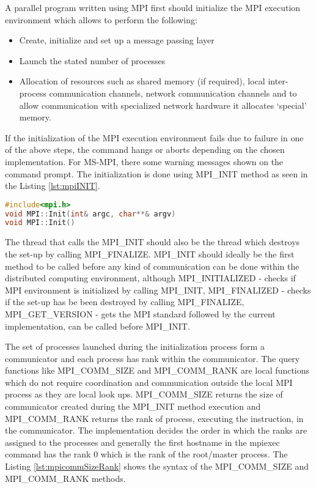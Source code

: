 A parallel program written using MPI first should initialize the MPI execution environment which allows to perform the following:
\begin{itemize}
\item Create, initialize and set up a message passing layer
\item Launch the stated number of processes
\item Allocation of resources such as shared memory (if required), local inter-process communication channels,
network communication channels and to allow communication with specialized network hardware it allocates {\lq}special{\rq} memory.  
\end{itemize}

If the initialization of the MPI execution environment fails due to failure in one of the above steps, the command hangs or aborts depending on the chosen implementation. For MS-MPI, there some warning messages shown on the command prompt. The initialization is done using MPI\_INIT method as seen in the Listing \ref{lst:mpiINIT}. 

\begin{lstlisting}[language=C++,label={lst:mpiINIT},caption={Initialization of Execution Environment}]
#include<mpi.h>
void MPI::Init(int& argc, char**& argv)
void MPI::Init()
\end{lstlisting}

The thread that calls the MPI\_INIT should also be the thread which destroys the set-up by calling MPI\_FINALIZE. MPI\_INIT should ideally be the first method to be called before any kind of communication can be done within the distributed computing environment, although MPI\_INITIALIZED - checks if MPI environment is initialized by calling MPI\_INIT, MPI\_FINALIZED - checks if the set-up has be been destroyed by calling MPI\_FINALIZE, MPI\_GET\_VERSION - gets the MPI standard followed by the current implementation, can be called before MPI\_INIT. \newline

The set of processes launched during the initialization process form a communicator and each process has rank within the communicator.
The query functions like MPI\_COMM\_SIZE and MPI\_COMM\_RANK are local functions which do not require coordination and communication outside the local MPI process as they are local look ups. MPI\_COMM\_SIZE returns the size of communicator created during the  MPI\_INIT method execution and MPI\_COMM\_RANK returns the rank of process, executing the instruction, in the communicator. The implementation decides the order in which the ranks are assigned to the processes and generally the first hostname in the mpiexec command has the rank 0 which is the rank of the root/master process. The Listing \ref{lst:mpicommSizeRank} shows the syntax of the MPI\_COMM\_SIZE and MPI\_COMM\_RANK methods.

